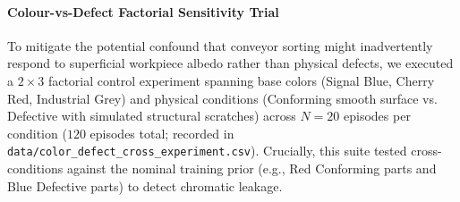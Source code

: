 \documentclass[journal]{IEEEtran}
\begin{document}
\paragraph{Colour-vs-Defect Factorial Sensitivity Trial}
To mitigate the potential confound that conveyor sorting might inadvertently respond to superficial workpiece albedo rather than physical defects, we executed a $2 \times 3$ factorial control experiment spanning base colors (Signal Blue, Cherry Red, Industrial Grey) and physical conditions (Conforming smooth surface vs. Defective with simulated structural scratches) across $N=20$ episodes per condition ($120$ episodes total; recorded in \texttt{data/color\_defect\_cross\_experiment.csv}). Crucially, this suite tested cross-conditions against the nominal training prior (e.g., Red Conforming parts and Blue Defective parts) to detect chromatic leakage.

\begin{table}[!t]
\centering
\caption{Colour-vs-Defect Factorial Control Experiment ($N=20$ per Condition, 120 Episodes Total)}
\label{table_color_defect_trial}
\footnotesize
{}
\end{table}
\end{document}
